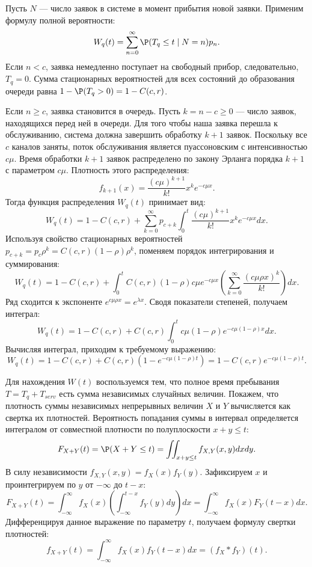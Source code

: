 \begin{sproof}
Пусть $N$ — число заявок в системе в момент прибытия новой заявки. Применим формулу полной вероятности:
$$
W_q(t) = \sum_{n=0}^{\infty} \P(T_q \le t \mid N = n) p_n.
$$
Если $n < c$, заявка немедленно поступает на свободный прибор, следовательно, $T_q = 0$. Сумма стационарных вероятностей для всех состояний до образования очереди равна $1 - \P(T_q > 0) = 1 - C(c, r)$.

Если $n \ge c$, заявка становится в очередь. Пусть $k = n - c \ge 0$ — число заявок, находящихся перед ней в очереди. Для того чтобы наша заявка перешла к обслуживанию, система должна завершить обработку $k+1$ заявок. Поскольку все $c$ каналов заняты, поток обслуживания является пуассоновским с интенсивностью $c\mu$. Время обработки $k+1$ заявок распределено по закону Эрланга порядка $k+1$ с параметром $c\mu$. Плотность этого распределения:
$$
f_{k+1}(x) = \frac{(c\mu)^{k+1}}{k!} x^k e^{-c\mu x}.
$$
Тогда функция распределения $W_q(t)$ принимает вид:
$$
W_q(t) = 1 - C(c, r) + \sum_{k=0}^{\infty} p_{c+k} \int_0^t \frac{(c\mu)^{k+1}}{k!} x^k e^{-c\mu x} dx.
$$
Используя свойство стационарных вероятностей $p_{c+k} = p_c \rho^k = C(c, r)(1-\rho)\rho^k$, поменяем порядок интегрирования и суммирования:
$$
W_q(t) = 1 - C(c, r) + \int_0^t C(c, r)(1-\rho) c\mu e^{-c\mu x} \left( \sum_{k=0}^{\infty} \frac{(c\mu\rho x)^k}{k!} \right) dx.
$$
Ряд сходится к экспоненте $e^{c\mu\rho x} = e^{\lambda x}$. Сводя показатели степеней, получаем интеграл:
$$
W_q(t) = 1 - C(c, r) + C(c, r) \int_0^t c\mu(1-\rho) e^{-c\mu(1-\rho)x} dx.
$$
Вычисляя интеграл, приходим к требуемому выражению:
$$
W_q(t) = 1 - C(c, r) + C(c, r) \left( 1 - e^{-c\mu(1-\rho)t} \right) = 1 - C(c, r) e^{-c\mu(1-\rho)t}.
$$

Для нахождения $W(t)$ воспользуемся тем, что полное время пребывания $T = T_q + T_{serv}$ есть сумма независимых случайных величин. Покажем, что плотность суммы независимых непрерывных величин $X$ и $Y$ вычисляется как свертка их плотностей. Вероятность попадания суммы в интервал определяется интегралом от совместной плотности по полуплоскости $x + y \le t$:
$$
F_{X+Y}(t) = \P(X+Y \le t) = \iint_{x+y \le t} f_{X,Y}(x,y) dx dy.
$$
В силу независимости $f_{X,Y}(x,y) = f_X(x)f_Y(y)$. Зафиксируем $x$ и проинтегрируем по $y$ от $-\infty$ до $t-x$:
$$
F_{X+Y}(t) = \int_{-\infty}^{\infty} f_X(x) \left( \int_{-\infty}^{t-x} f_Y(y) dy \right) dx = \int_{-\infty}^{\infty} f_X(x) F_Y(t-x) dx.
$$
Дифференцируя данное выражение по параметру $t$, получаем формулу свертки плотностей:
$$
f_{X+Y}(t) = \int_{-\infty}^{\infty} f_X(x) f_Y(t-x) dx = (f_X * f_Y)(t).
$$


\end{sproof}
